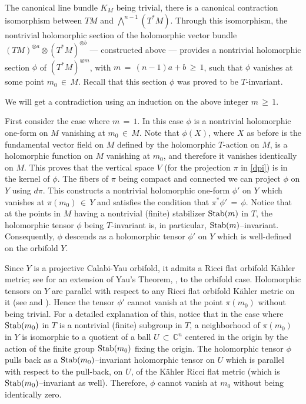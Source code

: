 \documentclass[12pt,reqno]{amsart}
\theoremstyle{definition}
\numberwithin{equation}{section}
\begin{document}
The canonical line bundle $K_M$ being trivial, there is a canonical contraction isomorphism between $TM$ 
and $\bigwedge^{n-1} (T^*M)$. Through this isomorphism, the nontrivial holomorphic section of the 
holomorphic vector bundle $(TM)^{\otimes a}\otimes (T^*M)^{\otimes b}$ --- constructed above --- provides a 
nontrivial holomorphic section $\phi$ of $(T^*M)^{\otimes m}$, with $m\,=\,(n-1)a+b \,\geq\, 1$, such that 
$\phi$ vanishes at some point $m_0 \,\in\, M$. Recall that this section $\phi$ was proved to be 
$T$-invariant.

We will get a contradiction using an induction on the above integer $m \,\geq\, 1$.

First consider the case where $m\,=\,1$. In this case $\phi$ is a nontrivial holomorphic one-form on $M$ 
vanishing at $m_0 \,\in\, M$. Note that $\phi(X)$, where $X$ as before is the fundamental vector
field on $M$ defined by the holomorphic $T$-action on $M$, is a holomorphic function on $M$ vanishing at $m_0$, and 
therefore it vanishes identically on $M$. This proves that the vertical space $V$ (for the projection $\pi$ 
in \eqref{dpi}) is in the kernel of $\phi$. The fibers of $\pi$ being compact and connected we can project 
$\phi$ on $Y$ using $d \pi$. This constructs a nontrivial holomorphic one-form $\phi'$ on $Y$ which 
vanishes at $\pi(m_0) \,\in \,Y$ and satisfies the condition that ${\pi^*}\phi' \, =\,\phi$. Notice that at 
the points in $M$ having a nontrivial (finite) stabilizer ${\rm Stab}(m)$ in $T$, the holomorphic tensor 
$\phi$ being $T$-invariant is, in particular, ${\rm Stab}(m)$--invariant. Consequently, $\phi$ descends as a 
holomorphic tensor $\phi'$ on $Y$ which is well-defined on the orbifold $Y$.

Since $Y$ is a projective Calabi-Yau orbifold, it admits a Ricci flat orbifold K\"ahler metric; see 
\cite[Th\'eor\`eme 4.1]{Ca} for an extension of Yau's Theorem, \cite{Ya}, to the orbifold case. Holomorphic 
tensors on $Y$ are parallel with respect to any Ricci flat orbifold K\"ahler metric on it (see 
\cite[Theorem 8.2]{GGK} and \cite[Theorem A]{CGGN}). Hence the tensor $\phi'$ cannot vanish at the point 
$\pi(m_0)$ without being trivial. For a detailed explanation of this, notice that in the case where
${\rm Stab}(m_0)$ 
in $T$ is a nontrivial (finite) subgroup in $T$, a neighborhood of $\pi(m_0)$ in $Y$ is isomorphic to a 
quotient of a ball $U \,\subset\, \mathbb C^n$ centered in the origin by the action of the finite group ${\rm 
Stab}(m_0)$ fixing the origin. The holomorphic tensor $\phi$ pulls back as a ${\rm Stab}(m_0)$--invariant 
holomorphic tensor on $U$ which is parallel with respect to the pull-back, on $U$, of the K\"ahler Ricci
flat metric (which is ${\rm Stab}(m_0)$--invariant as well). Therefore, $\phi$ cannot vanish at $m_0$
without being identically zero.
\end{document}
